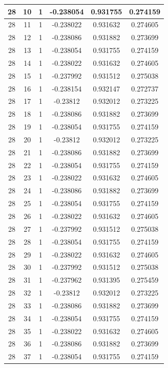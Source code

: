 \documentclass[12pt,a4paper]{article}
\numberwithin{equation}{section}
\numberwithin{figure}{section}
\numberwithin{table}{section}
\begin{document}
\begin{longtable}{|c|c|c|c|c|c|}
28 & 10 & 1 & -0.238054 & 0.931755 & 0.274159 \\ \hline
28 & 11 & 1 & -0.238022 & 0.931632 & 0.274605 \\ \hline
28 & 12 & 1 & -0.238086 & 0.931882 & 0.273699 \\ \hline
28 & 13 & 1 & -0.238054 & 0.931755 & 0.274159 \\ \hline
28 & 14 & 1 & -0.238022 & 0.931632 & 0.274605 \\ \hline
28 & 15 & 1 & -0.237992 & 0.931512 & 0.275038 \\ \hline
28 & 16 & 1 & -0.238154 & 0.932147 & 0.272737 \\ \hline
28 & 17 & 1 & -0.23812 & 0.932012 & 0.273225 \\ \hline
28 & 18 & 1 & -0.238086 & 0.931882 & 0.273699 \\ \hline
28 & 19 & 1 & -0.238054 & 0.931755 & 0.274159 \\ \hline
28 & 20 & 1 & -0.23812 & 0.932012 & 0.273225 \\ \hline
28 & 21 & 1 & -0.238086 & 0.931882 & 0.273699 \\ \hline
28 & 22 & 1 & -0.238054 & 0.931755 & 0.274159 \\ \hline
28 & 23 & 1 & -0.238022 & 0.931632 & 0.274605 \\ \hline
28 & 24 & 1 & -0.238086 & 0.931882 & 0.273699 \\ \hline
28 & 25 & 1 & -0.238054 & 0.931755 & 0.274159 \\ \hline
28 & 26 & 1 & -0.238022 & 0.931632 & 0.274605 \\ \hline
28 & 27 & 1 & -0.237992 & 0.931512 & 0.275038 \\ \hline
28 & 28 & 1 & -0.238054 & 0.931755 & 0.274159 \\ \hline
28 & 29 & 1 & -0.238022 & 0.931632 & 0.274605 \\ \hline
28 & 30 & 1 & -0.237992 & 0.931512 & 0.275038 \\ \hline
28 & 31 & 1 & -0.237962 & 0.931395 & 0.275459 \\ \hline
28 & 32 & 1 & -0.23812 & 0.932012 & 0.273225 \\ \hline
28 & 33 & 1 & -0.238086 & 0.931882 & 0.273699 \\ \hline
28 & 34 & 1 & -0.238054 & 0.931755 & 0.274159 \\ \hline
28 & 35 & 1 & -0.238022 & 0.931632 & 0.274605 \\ \hline
28 & 36 & 1 & -0.238086 & 0.931882 & 0.273699 \\ \hline
28 & 37 & 1 & -0.238054 & 0.931755 & 0.274159 \\ \hline

\end{longtable}
\end{document}
